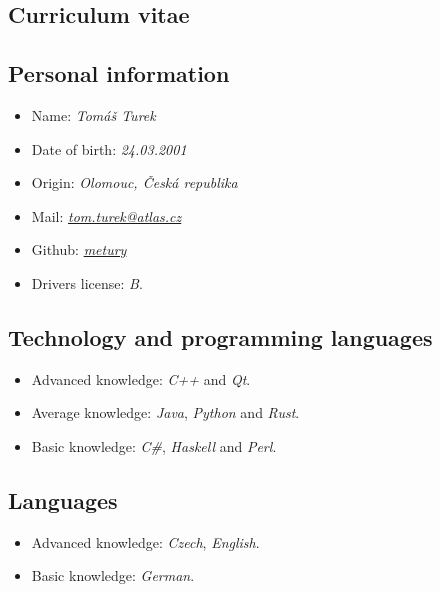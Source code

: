 \documentclass{article}
\begin{document}
	
\begin{center}
	\section*{{\huge Curriculum vitae}}
\end{center}

\hfill

\begin{minipage}[c]{.45\textwidth}
	\subsection*{Personal information}
	\begin{itemize}
		\item Name: \textit{Tomáš Turek}
		\item Date of birth: \textit{24.03.2001}
		\item Origin: \textit{Olomouc, Česká republika}
		\item Mail: \href{mailto:tom.turek@atlas.cz}{\textit{tom.turek@atlas.cz}}
		\item Github: \href{https://github.com/metury}{\textit{metury}}
		\item Drivers license: \textit{B}.
	\end{itemize}
\end{minipage}
\hfill
\begin{minipage}[c]{.5\textwidth}
	\subsection*{Technology and programming languages}
	\begin{itemize}
		\item Advanced knowledge: \textit{C++} and \textit{Qt}.
		\item Average knowledge: \textit{Java}, \textit{Python} and \textit{Rust}.
		\item Basic knowledge: \textit{C\#}, \textit{Haskell} and \textit{Perl}.
	\end{itemize}
	
	\subsection*{Languages}
	\begin{itemize}
		\item Advanced knowledge: \textit{Czech}, \textit{English}.
		\item Basic knowledge: \textit{German}.
	\end{itemize}
\end{minipage}
\end{document}
